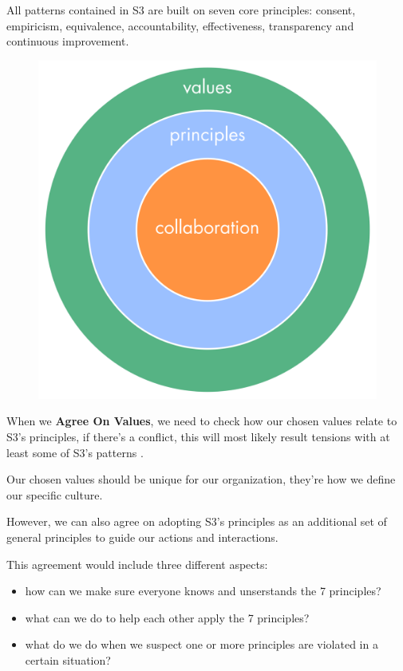 All patterns contained in S3 are built on seven core principles: consent, empiricism, equivalence, accountability, effectiveness, transparency and continuous improvement.

\begin{figure}[htbp]
\centering
\includegraphics[keepaspectratio,width=\textwidth,height=0.75\textheight]{img/collaboration-values/values-step3.png}
\end{figure}

When we \textbf{Agree On Values}, we need to check how our chosen values relate to S3's principles, if there's a conflict, this will most likely result tensions with at least some of S3's patterns .

Our chosen values should be unique for our organization, they're how we define our specific culture.

However, we can also agree on adopting S3's principles as an additional set of general principles to guide our actions and interactions.

This agreement would include three different aspects:

\begin{itemize}
\item how can we make sure everyone knows and unserstands the 7 principles?

\item what can we do to help each other apply the 7 principles?

\item what do we do when we suspect one or more principles are violated in a certain situation?

\end{itemize}

